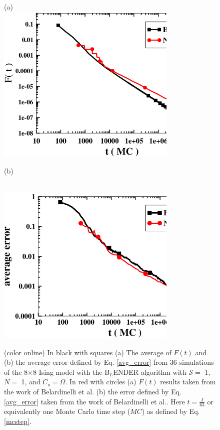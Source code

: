\documentclass[aps,pre,reprint,superscriptaddress,showkeys]{revtex4-1}
\begin{document}
\begin{figure}
(a)\\
\includegraphics[width=8.6cm]{fig5a.eps}
\centerline{(b)}\\
\includegraphics[width=8.6cm]{fig5b.eps}
\caption{(color online) In black with squares (a) The average of $F(t)$ and (b) the average error defined by Eq. \ref{avg_error}  from 36 simulations of the 8$\times$8  Ising model with the B$_L$ENDER algorithm with $\mathcal{S}=$ 1, $N=$ 1, and $C_o = \Omega$. In red with circles (a) $F(t)$ results taken from the work of Belardinelli et al. \cite{saturation} (b) the error defined by Eq. \ref{avg_error} taken from the  work of Belardinelli et al.. Here $t = \frac{I}{63}$ or equivalently one Monte Carlo time step ($MC$) as defined by Eq. \ref{mcstep}.\label{FtandA} }
\end{figure}
\end{document}
